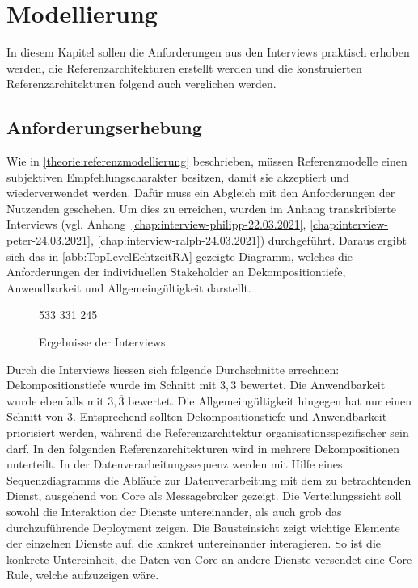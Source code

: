 \chapter{Modellierung}
In diesem Kapitel sollen die Anforderungen aus den Interviews praktisch erhoben werden, die Referenzarchitekturen erstellt werden und die konstruierten Referenzarchitekturen folgend auch verglichen werden.
\section{Anforderungserhebung}
Wie in \autoref{theorie:referenzmodellierung} beschrieben, müssen Referenzmodelle einen subjektiven Empfehlungscharakter besitzen, damit sie akzeptiert und wiederverwendet werden. Dafür muss ein Abgleich mit den Anforderungen der Nutzenden geschehen. Um dies zu erreichen, wurden im Anhang transkribierte Interviews (vgl. Anhang~\ref{chap:interview-philipp-22.03.2021}, \ref{chap:interview-peter-24.03.2021}, \ref{chap:interview-ralph-24.03.2021}) durchgeführt. Daraus ergibt sich das in \autoref{abb:TopLevelEchtzeitRA} gezeigte Diagramm, welches die Anforderungen der individuellen Stakeholder an Dekompositiontiefe, Anwendbarkeit und Allgemeingültigkeit darstellt.

\begin{figure}[H]
\centering
\spideroverview
{5}{3}{3}
{3}{3}{1}
{2}{4}{5}
\caption{Ergebnisse der Interviews}
\label{abb:DimensionenUebersicht}
\end{figure}
Durch die Interviews liessen sich folgende Durchschnitte errechnen: Dekompositionstiefe wurde im Schnitt mit $3,\overline{3}$ bewertet. Die Anwendbarkeit wurde ebenfalls mit $3,\overline{3}$ bewertet. Die Allgemeingültigkeit hingegen hat nur einen Schnitt von $3$. Entsprechend sollten Dekompositionstiefe und Anwendbarkeit priorisiert werden, während die Referenzarchitektur organisationsspezifischer sein darf. 
In den folgenden Referenzarchitekturen wird in mehrere Dekompositionen unterteilt. In der Datenverarbeitungssequenz werden mit Hilfe eines Sequenzdiagramms die Abläufe zur Datenverarbeitung mit dem zu betrachtenden Dienst, ausgehend von \AWSIOT{} Core als Messagebroker gezeigt.
Die Verteilungssicht soll sowohl die Interaktion der Dienste untereinander, als auch grob das durchzuführende Deployment zeigen. Die Bausteinsicht zeigt wichtige Elemente der einzelnen Dienste auf, die konkret untereinander interagieren. So ist die konkrete Untereinheit, die Daten von \AWSIOT{} Core an andere Dienste versendet eine \AWSIOT{} Core Rule, welche aufzuzeigen wäre. 


